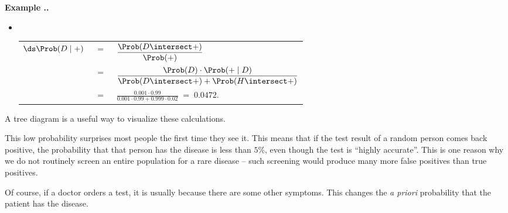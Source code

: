 \documentclass[twoside]{book}\usepackage[]{graphicx}\usepackage[]{xcolor}
\newcounter{example}[section]
\newenvironment{example}%
{\refstepcounter{example}%
\textbf{Example \thesection.\arabic{example}. }}%
{}
\begin{document}
\begin{example}
\begin{itemize}
	  \item $\!\!\!\!\!$
	  \begin{tabular}[t]{rcl}
	  $\ds \Prob(D \mid +) $
		&$\!=\!$& $\displaystyle \frac{\Prob(D \intersect +)}{\Prob(+)}$
		\\[5mm]
		&$\; = \;$& 
		$\displaystyle \frac{\Prob(D) \cdot \Prob(+ \mid D)}{\Prob(D \intersect +) 
			+ \Prob(H \intersect +)  }$
			\\[5mm]
			& $\!=\!$ & $\displaystyle 
				\frac{0.001 \cdot 0.99}{0.001 \cdot 0.99 + 0.999 \cdot 0.02}
		            \; = \;  0.0472$. 
		\end{tabular}
	  \end{itemize}
	  A tree diagram is a useful way to visualize these calculations.
\begin{center}
\end{center}

	  This low probability surprises most people the first time they see it.
	  This means that if the test result of a random person comes back positive,
	  the probability that that person has the disease is less than $5$\%, 
	  even though the test is ``highly accurate''.   
	  This is one reason why we do not routinely 
	  screen an entire population for a rare disease -- such screening would 
	  produce many more false positives than true positives.

	  Of course, if a doctor orders a test, it is usually because there 
	  are some other symptoms.  This changes the \emph{a priori} probability
	  that the patient has the disease.  
\end{example}

\newpage
\end{document}
